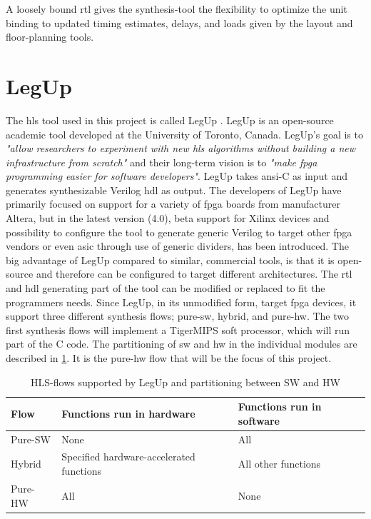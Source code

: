 A loosely bound \gls{rtl} gives the synthesis-tool the flexibility to optimize the unit binding to updated timing estimates, delays, and loads given by the layout and floor-planning tools.

\section{LegUp}
The \gls{hls} tool used in this project is called LegUp \cite{canis2011legup}. LegUp is an open-source academic tool developed at the University of Toronto, Canada. LegUp's goal is to \textit{"allow researchers to experiment with new \gls{hls} algorithms without building a new infrastructure from scratch"} and their long-term vision is to \textit{"make \gls{fpga} programming easier for software developers"}. LegUp takes \gls{ansi}-C as input and generates synthesizable Verilog \gls{hdl} as output. The developers of LegUp have primarily focused on support for a variety of \gls{fpga} boards from manufacturer Altera, but in the latest version (4.0), beta support for Xilinx devices and possibility to configure the tool to generate generic Verilog to target other \gls{fpga} vendors or even \gls{asic} through use of generic dividers, has been introduced. The big advantage of LegUp compared to similar, commercial tools, is that it is open-source and therefore can be configured to target different architectures. The \gls{rtl} and \gls{hdl} generating part of the tool can be modified or replaced to fit the programmers needs.
Since LegUp, in its unmodified form, target \gls{fpga} devices, it support three different synthesis flows; pure-\gls{sw}, hybrid, and pure-\gls{hw}. The two first synthesis flows will implement a TigerMIPS \cite{tigmips} soft processor, which will run part of the C code. The partitioning of \gls{sw} and \gls{hw} in the individual modules are described in \cref{tab:legupflows}. It is the pure-\gls{hw} flow that will be the focus of this project.

\begin{table}[hbpt]
    \centering
    \caption{\label{tab:legupflows}HLS-flows supported by LegUp and partitioning between SW and HW}
    \begin{tabular}{lp{4.8cm}p{4.8cm}}
      \textbf{Flow} & \textbf{Functions run in hardware} & \textbf{Functions run in software}\\
      \toprule
      Pure-SW & None & All \\
      \hline
      Hybrid & Specified hardware-accelerated functions & All other functions \\
      \hline
      Pure-HW & All & None\\
      \bottomrule
    \end{tabular}
\end{table}

